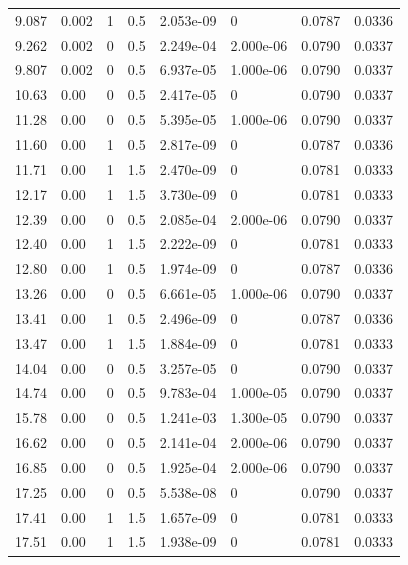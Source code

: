 \documentclass[preview]{standalone}
\begin{document}
{{\begin{tabular}{L{1.2cm}C{1.2cm} C{0.3cm}C{0.5cm} C{1.4cm}C{1.4cm} C{1.4cm}C{1.4cm}}
  9.087  &  0.002  & 1     & 0.5 &  2.053e-09  & 0  & 0.0787 &  0.0336   \\ 
  9.262  &  0.002  & 0     & 0.5 &  2.249e-04  & 2.000e-06  & 0.0790 &  0.0337   \\ 
  9.807  &  0.002  & 0     & 0.5 &  6.937e-05  & 1.000e-06  & 0.0790 &  0.0337   \\ 
  10.63  &  0.00  & 0     & 0.5 &  2.417e-05  & 0  & 0.0790 &  0.0337   \\ 
  11.28  &  0.00  & 0     & 0.5 &  5.395e-05  & 1.000e-06  & 0.0790 &  0.0337   \\ 
  11.60  &  0.00  & 1     & 0.5 &  2.817e-09  & 0  & 0.0787 &  0.0336   \\ 
  11.71  &  0.00  & 1     & 1.5 &  2.470e-09  & 0  & 0.0781 &  0.0333   \\ 
  12.17  &  0.00  & 1     & 1.5 &  3.730e-09  & 0  & 0.0781 &  0.0333   \\ 
  12.39  &  0.00  & 0     & 0.5 &  2.085e-04  & 2.000e-06  & 0.0790 &  0.0337   \\ 
  12.40  &  0.00  & 1     & 1.5 &  2.222e-09  & 0  & 0.0781 &  0.0333   \\ 
  12.80  &  0.00  & 1     & 0.5 &  1.974e-09  & 0  & 0.0787 &  0.0336   \\ 
  13.26  &  0.00  & 0     & 0.5 &  6.661e-05  & 1.000e-06  & 0.0790 &  0.0337   \\ 
  13.41  &  0.00  & 1     & 0.5 &  2.496e-09  & 0  & 0.0787 &  0.0336   \\ 
  13.47  &  0.00  & 1     & 1.5 &  1.884e-09  & 0  & 0.0781 &  0.0333   \\ 
  14.04  &  0.00  & 0     & 0.5 &  3.257e-05  & 0  & 0.0790 &  0.0337   \\ 
  14.74  &  0.00  & 0     & 0.5 &  9.783e-04  & 1.000e-05  & 0.0790 &  0.0337   \\ 
  15.78  &  0.00  & 0     & 0.5 &  1.241e-03  & 1.300e-05  & 0.0790 &  0.0337   \\ 
  16.62  &  0.00  & 0     & 0.5 &  2.141e-04  & 2.000e-06  & 0.0790 &  0.0337   \\ 
  16.85  &  0.00  & 0     & 0.5 &  1.925e-04  & 2.000e-06  & 0.0790 &  0.0337   \\ 
  17.25  &  0.00  & 0     & 0.5 &  5.538e-08  & 0  & 0.0790 &  0.0337   \\ 
  17.41  &  0.00  & 1     & 1.5 &  1.657e-09  & 0  & 0.0781 &  0.0333   \\ 
  17.51  &  0.00  & 1     & 1.5 &  1.938e-09  & 0  & 0.0781 &  0.0333   \\ 

\end{tabular}}}
\end{document}
